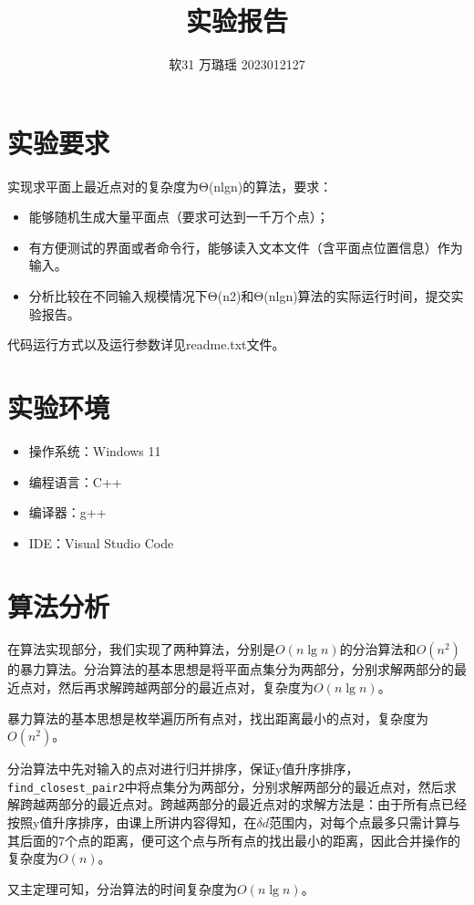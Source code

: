 \documentclass[a4paper,9pt]{article}
\begin{document}
\title{实验报告}
\author{软31 万璐瑶 2023012127}
\maketitle
\section{实验要求}
实现求平面上最近点对的复杂度为Θ(nlgn)的算法，要求：
\begin{itemize}
    \item 能够随机生成大量平面点（要求可达到一千万个点）；
    \item 有方便测试的界面或者命令行，能够读入文本文件（含平面点位置信息）作为输入。
    \item 分析比较在不同输入规模情况下Θ(n2)和Θ(nlgn)算法的实际运行时间，提交实验报告。
\end{itemize}
代码运行方式以及运行参数详见readme.txt文件。
\section{实验环境}
\begin{itemize}
    \item 操作系统：Windows 11
    \item 编程语言：C++
    \item 编译器：g++
    \item IDE：Visual Studio Code
\end{itemize}

\section{算法分析}

在算法实现部分，我们实现了两种算法，分别是$O(n\lg n)$的分治算法和$O(n^2)$的暴力算法。分治算法的基本思想是将平面点集分为两部分，分别求解两部分的最近点对，然后再求解跨越两部分的最近点对，复杂度为$O(n\lg n)$。

暴力算法的基本思想是枚举遍历所有点对，找出距离最小的点对，复杂度为$O(n^2)$。

分治算法中先对输入的点对进行归并排序，保证y值升序排序，\verb|find_closest_pair2|中将点集分为两部分，分别求解两部分的最近点对，然后求解跨越两部分的最近点对。跨越两部分的最近点对的求解方法是：由于所有点已经按照y值升序排序，由课上所讲内容得知，在$\delta d$范围内，对每个点最多只需计算与其后面的7个点的距离，便可这个点与所有点的找出最小的距离，因此合并操作的复杂度为$O(n)$。

又主定理可知，分治算法的时间复杂度为$O(n\lg n)$。
\end{document}

